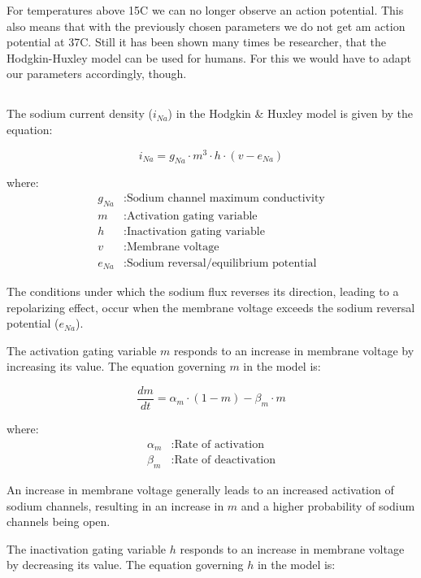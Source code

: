 \documentclass{article}
\begin{document}
    For temperatures above 15\°C we can no longer observe an action potential.
    This also means that with the previously chosen parameters we do not get am action potential at 37\°C.
    Still it has been shown many times be researcher, that the Hodgkin-Huxley model can be used for humans.
    For this we would have to adapt our parameters accordingly, though.

    \subsection{}
    The sodium current density (\(i_{Na}\)) in the Hodgkin \& Huxley model is given by the equation:

    \[ i_{Na} = g_{Na} \cdot m^3 \cdot h \cdot (v - e_{Na}) \]

    where:
    \begin{align*}
        g_{Na} & : \text{Sodium channel maximum conductivity} \\
        m & : \text{Activation gating variable} \\
        h & : \text{Inactivation gating variable} \\
        v & : \text{Membrane voltage} \\
        e_{Na} & : \text{Sodium reversal/equilibrium potential}
    \end{align*}

    The conditions under which the sodium flux reverses its direction, leading to a repolarizing effect, occur when the membrane voltage exceeds the sodium reversal potential (\(e_{Na}\)).

    \vspace{10pt}
    The activation gating variable \(m\) responds to an increase in membrane voltage by increasing its value.
    The equation governing \(m\) in the model is:

    \[ \frac{dm}{dt} = \alpha_m \cdot (1 - m) - \beta_m \cdot m \]

    where:
    \begin{align*}
        \alpha_m & : \text{Rate of activation} \\
        \beta_m & : \text{Rate of deactivation}
    \end{align*}

    An increase in membrane voltage generally leads to an increased activation of sodium channels, resulting in an increase in \(m\) and a higher probability of sodium channels being open.

    \vspace{10pt}
    The inactivation gating variable \(h\) responds to an increase in membrane voltage by decreasing its value.
    The equation governing \(h\) in the model is:
\end{document}
